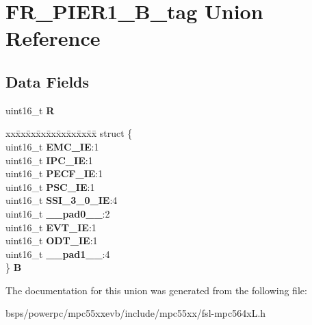 \hypertarget{unionFR__PIER1__16B__tag}{}\section{F\+R\+\_\+\+P\+I\+E\+R1\+\_\+B\+\_\+tag Union Reference}
\label{unionFR__PIER1__16B__tag}
\subsection*{Data Fields}
\begin{DoxyCompactItemize}
\item 
\mbox{\label{unionFR__PIER1__16B__tag_af794d0e9df44edb461240fa048e47c48}} 
uint16\+\_\+t {\bfseries R}
\item 
\mbox{\label{unionFR__PIER1__16B__tag_a08ea193cd00b20ecc0b30ce8f23986e4}} 
\begin{tabbing}
xx\=xx\=xx\=xx\=xx\=xx\=xx\=xx\=xx\=\kill
struct \{\\
\>uint16\_t {\bfseries EMC\_IE}:1\\
\>uint16\_t {\bfseries IPC\_IE}:1\\
\>uint16\_t {\bfseries PECF\_IE}:1\\
\>uint16\_t {\bfseries PSC\_IE}:1\\
\>uint16\_t {\bfseries SSI\_3\_0\_IE}:4\\
\>uint16\_t {\bfseries \_\_pad0\_\_}:2\\
\>uint16\_t {\bfseries EVT\_IE}:1\\
\>uint16\_t {\bfseries ODT\_IE}:1\\
\>uint16\_t {\bfseries \_\_pad1\_\_}:4\\
\} {\bfseries B}\\

\end{tabbing}\end{DoxyCompactItemize}


The documentation for this union was generated from the following file\+:\begin{DoxyCompactItemize}
\item 
bsps/powerpc/mpc55xxevb/include/mpc55xx/fsl-\/mpc564x\+L.\+h\end{DoxyCompactItemize}
